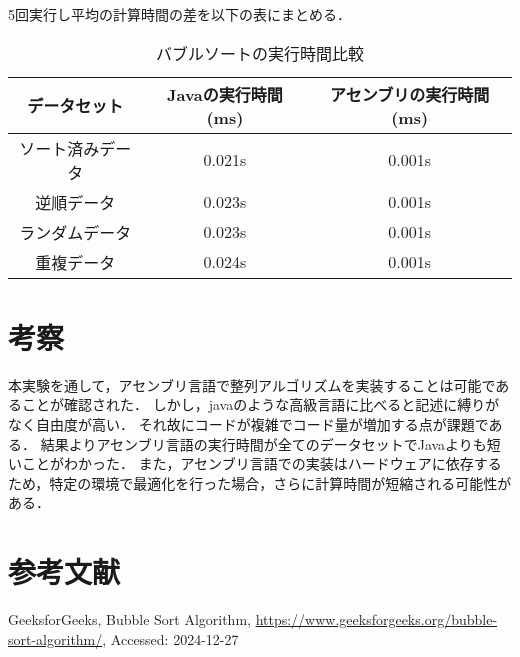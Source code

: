 \documentclass{jlreq}
\begin{document}
5回実行し平均の計算時間の差を以下の表にまとめる．
\begin{table}[h]
    \centering
    \begin{tabular}{|c|c|c|}
        \hline
        \textbf{データセット} & \textbf{Javaの実行時間 (ms)} & \textbf{アセンブリの実行時間 (ms)} \\
        \hline
        ソート済みデータ & 0.021s & 0.001s \\
        逆順データ & 0.023s & 0.001s \\
        ランダムデータ & 0.023s & 0.001s \\
        重複データ & 0.024s & 0.001s \\
        \hline
    \end{tabular}
    \caption{バブルソートの実行時間比較}
\end{table}
\section{考察}
本実験を通して，アセンブリ言語で整列アルゴリズムを実装することは可能であることが確認された．
しかし，javaのような高級言語に比べると記述に縛りがなく自由度が高い．
それ故にコードが複雑でコード量が増加する点が課題である．
結果よりアセンブリ言語の実行時間が全てのデータセットでJavaよりも短いことがわかった．
また，アセンブリ言語での実装はハードウェアに依存するため，特定の環境で最適化を行った場合，さらに計算時間が短縮される可能性がある．

\section*{参考文献}
GeeksforGeeks, Bubble Sort Algorithm,  
\url{https://www.geeksforgeeks.org/bubble-sort-algorithm/},  
Accessed: 2024-12-27
\end{document}
